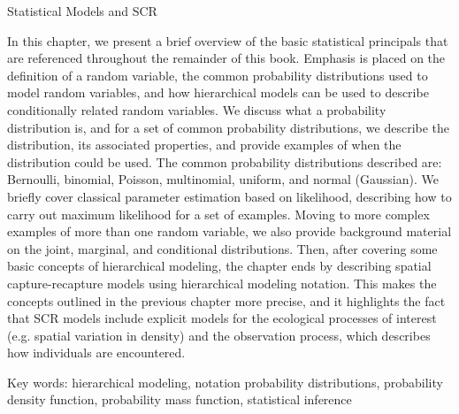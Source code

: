 Statistical Models and SCR

In this chapter, we present a brief overview of the basic statistical
principals that are referenced throughout the remainder of this
book. Emphasis is placed on the definition of a random variable, the
common probability distributions used to model random variables, and
how hierarchical models can be used to describe conditionally related
random variables.  We discuss what a probability distribution is, and
for a set of common probability distributions, we describe the
distribution, its associated properties, and provide examples of when
the distribution could be used.  The common probability distributions
described are: Bernoulli, binomial, Poisson, multinomial, uniform, and
normal (Gaussian).  We briefly cover classical parameter estimation
based on likelihood, describing how to  carry out maximum likelihood
for a set of examples.  Moving to more complex examples of more than
one random variable, we also provide background material on the joint,
marginal, and conditional distributions.  Then, after covering some
basic concepts of hierarchical modeling, the chapter ends by
describing spatial capture-recapture models using hierarchical
modeling notation. This makes the concepts outlined in the previous
chapter more precise, and it highlights the fact that SCR models
include explicit models for the ecological processes of interest
(e.g. spatial variation in density) and the observation process, which
describes how individuals are encountered.

Key words:
hierarchical modeling,
notation
probability distributions,
probability density function, probability mass function,
statistical inference
